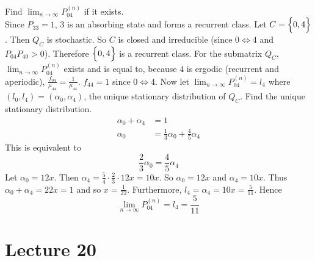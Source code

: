 \documentclass[12pt]{article}
\begin{document}
Find $\lim_{n\to\infty} P_{04}^{(n)}$ if it exists. \\ Since $P_{33} = 1$, $3$ is an absorbing state and forms a recurrent class. Let $C = \Big\{ 0,4 \Big\}$. Then $Q_C$ is stochastic. So $C$ is closed and irreducible (since $0\iff4$ and $P_{04}P_{40} > 0$). Therefore $\Big\{ 0,4 \Big\}$ is a recurrent class. For the submatrix $Q_C$, $\lim_{n\to\infty} P_{04}^{(n)}$ exists and is equal to, because $4$ is ergodic (recurrent and aperiodic), $\frac{f_{04}}{\mu_{44}} = \frac{1}{\mu_{44}}$. $f_{44} = 1$ since $0\iff4$. Now let $\lim_{n\to\infty} P_{04}^{(n)} = l_4$ where $(l_0,l_4) = (\alpha_0,\alpha_4)$, the unique stationary distribution of $Q_C$. Find the unique stationary distribution. $$ \begin{aligned} \alpha_0 + \alpha_4 &= 1 \\ \alpha_0 &= \frac{1}{3}\alpha_0 + \frac{4}{5}\alpha_4 \end{aligned} $$ This is equivalent to $$ \frac{2}{3}\alpha_0 = \frac{4}{5}\alpha_4  $$ Let $\alpha_0 = 12x$. Then $\alpha_4 = \frac{5}{4} \cdot \frac{2}{3} \cdot 12x = 10x$. So $\alpha_0 = 12x$ and $\alpha_4 = 10x$. Thus $\alpha_0 + \alpha_4 = 22x = 1$ and so $x = \frac{1}{22}$. Furthermore, $l_4 = \alpha_4 = 10x = \frac{5}{11}$. Hence $$ \lim_{n\to\infty} P_{04}^{(n)} = l_4 = \frac{5}{11} $$ 


\section{Lecture 20}
\end{document}
